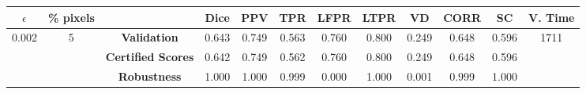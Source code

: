 \begin{longtable}{ c  c | c | c  c  c  c  c  c  c c c}
\toprule \textbf{$\epsilon$} & \textbf{\% pixels} & & \textbf{Dice} & \textbf{PPV} & \textbf{TPR} & \textbf{LFPR} & \textbf{LTPR} & \textbf{VD} & \textbf{CORR} & \textbf{SC} & \textbf{V. Time} \\
\midrule 
\multirow{3}{*}{0.002}  & \multirow{3}{*}{5} &\textbf{Validation} & 0.643 & 0.749 & 0.563 & 0.760 & 0.800 & 0.249 & 0.648 & 0.596 & \multirow{3}{*}{1711} \\
 & & \textbf{Certified Scores} & 0.642 & 0.749 & 0.562 & 0.760 & 0.800 & 0.249 & 0.648 & 0.596 & \\
& & \textbf{Robustness} & 1.000 & 1.000 & 0.999 & 0.000 & 1.000 & 0.001 & 0.999 & 1.000 & \\
\end{longtable}